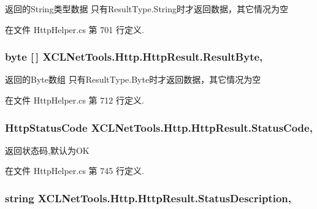 返回的\-String类型数据 只有\-Result\-Type.\-String时才返回数据，其它情况为空 



在文件 Http\-Helper.\-cs 第 701 行定义.

\hypertarget{class_x_c_l_net_tools_1_1_http_1_1_http_result_aca3f63e730af7bb4c40a345fc5d02423}{
\subsubsection[{Result\-Byte}]{\setlength{\rightskip}{0pt plus 5cm}byte \mbox{[}$\,$\mbox{]} X\-C\-L\-Net\-Tools.\-Http.\-Http\-Result.\-Result\-Byte\hspace{0.3cm}{\ttfamily [get]}, {\ttfamily [set]}}}\label{class_x_c_l_net_tools_1_1_http_1_1_http_result_aca3f63e730af7bb4c40a345fc5d02423}


返回的\-Byte数组 只有\-Result\-Type.\-Byte时才返回数据，其它情况为空 



在文件 Http\-Helper.\-cs 第 712 行定义.

\hypertarget{class_x_c_l_net_tools_1_1_http_1_1_http_result_a2790d609062ed072dbc4a40a82d9f32c}{
\subsubsection[{Status\-Code}]{\setlength{\rightskip}{0pt plus 5cm}Http\-Status\-Code X\-C\-L\-Net\-Tools.\-Http.\-Http\-Result.\-Status\-Code\hspace{0.3cm}{\ttfamily [get]}, {\ttfamily [set]}}}\label{class_x_c_l_net_tools_1_1_http_1_1_http_result_a2790d609062ed072dbc4a40a82d9f32c}


返回状态码,默认为\-O\-K 



在文件 Http\-Helper.\-cs 第 745 行定义.

\hypertarget{class_x_c_l_net_tools_1_1_http_1_1_http_result_a365c2a2bd1deb98cde343b1123752d9c}{
\subsubsection[{Status\-Description}]{\setlength{\rightskip}{0pt plus 5cm}string X\-C\-L\-Net\-Tools.\-Http.\-Http\-Result.\-Status\-Description\hspace{0.3cm}{\ttfamily [get]}, {\ttfamily [set]}}}\label{class_x_c_l_net_tools_1_1_http_1_1_http_result_a365c2a2bd1deb98cde343b1123752d9c}


